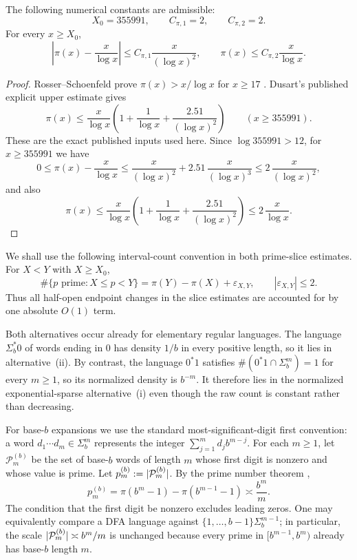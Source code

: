 \begin{lemma}
  \label{lem:explicit-pnt-input}
  The following numerical constants are admissible:
  \[
    X_0=355991,\qquad C_{\pi,1}=2,\qquad C_{\pi,2}=2.
  \]
  For every \(x\ge X_0\),
  \[
    \left|\pi(x)-\frac{x}{\log x}\right|
      \le C_{\pi,1}\frac{x}{(\log x)^2},
    \qquad
    \pi(x)\le C_{\pi,2}\frac{x}{\log x}.
  \]
\end{lemma}

\begin{proof}
  Rosser--Schoenfeld prove \(\pi(x)>x/\log x\) for \(x\ge17\)
  \cite{RosserSchoenfeld1962}. Dusart's published explicit upper
  estimate \cite[Theorem~1.10]{Dusart2018} gives
  \[
    \pi(x)\le
      \frac{x}{\log x}\left(1+\frac{1}{\log x}
        +\frac{2.51}{(\log x)^2}\right)
    \qquad (x\ge355991).
  \]
  These are the exact published inputs used here. Since
  \(\log 355991>12\), for \(x\ge355991\) we have
  \[
    0\le \pi(x)-\frac{x}{\log x}
    \le \frac{x}{(\log x)^2}
       +2.51\,\frac{x}{(\log x)^3}
    \le 2\,\frac{x}{(\log x)^2},
  \]
  and also
  \[
    \pi(x)\le
      \frac{x}{\log x}\left(1+\frac{1}{\log x}
        +\frac{2.51}{(\log x)^2}\right)
      \le 2\,\frac{x}{\log x}.
  \]
\end{proof}

We shall use the following interval-count convention in both prime-slice
estimates. For \(X<Y\) with \(X\ge X_0\),
\[
  \#\{p\text{ prime}:X\le p<Y\}
  =\pi(Y)-\pi(X)+\varepsilon_{X,Y},
  \qquad |\varepsilon_{X,Y}|\le2.
\]
Thus all half-open endpoint changes in the slice estimates are accounted
for by one absolute \(O(1)\) term.

\begin{remark}\label{rem:dfa-density-sharpness}
  Both alternatives occur already for elementary regular languages. The
  language \(\Sigma_b^\ast 0\) of words ending in \(0\) has density
  \(1/b\) in every positive length, so it lies in
  alternative~\textup{(ii)}. By contrast, the language \(0^\ast 1\)
  satisfies \(\#(0^\ast 1\cap\Sigma_b^m)=1\) for every \(m\ge 1\), so
  its normalized density is \(b^{-m}\). It therefore lies in the
  normalized exponential-sparse alternative~\textup{(i)} even though
  the raw count is constant rather than decreasing.
\end{remark}

For base-\(b\) expansions we use the standard most-significant-digit
first convention: a word \(d_1\cdots d_m\in\Sigma_b^m\) represents the
integer \(\sum_{j=1}^m d_j b^{m-j}\). For each \(m\ge 1\), let
\(\mathcal P_m^{(b)}\) be the set of base-\(b\) words of length \(m\)
whose first digit is nonzero and whose value is prime. Let
\(p_m^{(b)}:=\lvert \mathcal P_m^{(b)} \rvert\). By the prime number theorem
\cite{HardyWright2008},
\[
  p_m^{(b)}
  =\pi(b^m-1)-\pi(b^{m-1}-1)
  \asymp \frac{b^m}{m}.
\]
The condition that the first digit be nonzero excludes leading zeros.
One may equivalently compare a DFA language against
\(\{1,\dots,b-1\}\Sigma_b^{m-1}\); in particular, the scale
\(\lvert \mathcal P_m^{(b)} \rvert\asymp b^m/m\) is unchanged because every
prime in \([b^{m-1},b^m)\) already has base-\(b\) length \(m\).

